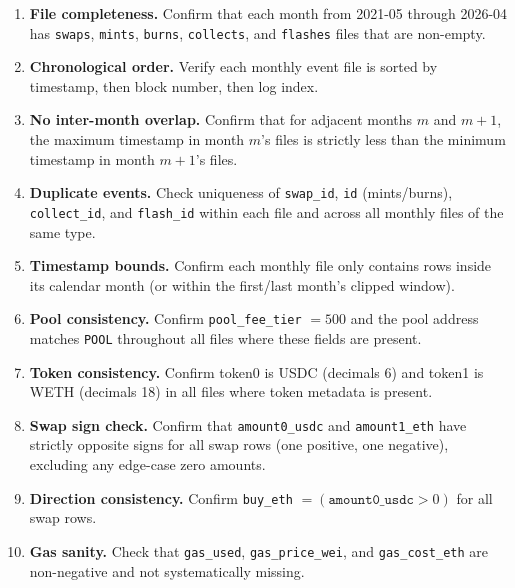 \documentclass[11pt,a4paper]{article}
\begin{document}
\begin{enumerate}
  \item \textbf{File completeness.} Confirm that each month from 2021-05
        through 2026-04 has \texttt{swaps}, \texttt{mints}, \texttt{burns},
        \texttt{collects}, and \texttt{flashes} files that are non-empty.

  \item \textbf{Chronological order.} Verify each monthly event file is
        sorted by timestamp, then block number, then log index.

  \item \textbf{No inter-month overlap.} Confirm that for adjacent months
        $m$ and $m+1$, the maximum timestamp in month $m$'s files is
        strictly less than the minimum timestamp in month $m+1$'s files.

  \item \textbf{Duplicate events.} Check uniqueness of \texttt{swap\_id},
        \texttt{id} (mints/burns), \texttt{collect\_id}, and
        \texttt{flash\_id} within each file and across all monthly files
        of the same type.

  \item \textbf{Timestamp bounds.} Confirm each monthly file only contains
        rows inside its calendar month (or within the first/last month's
        clipped window).

  \item \textbf{Pool consistency.} Confirm \texttt{pool\_fee\_tier} $=
        500$ and the pool address matches \texttt{POOL} throughout all files
        where these fields are present.

  \item \textbf{Token consistency.} Confirm token0 is USDC (decimals 6)
        and token1 is WETH (decimals 18) in all files where token metadata
        is present.

  \item \textbf{Swap sign check.} Confirm that \texttt{amount0\_usdc} and
        \texttt{amount1\_eth} have strictly opposite signs for all swap rows
        (one positive, one negative), excluding any edge-case zero amounts.

  \item \textbf{Direction consistency.} Confirm \texttt{buy\_eth} $=
        (\texttt{amount0\_usdc} > 0)$ for all swap rows.

  \item \textbf{Gas sanity.} Check that \texttt{gas\_used},
        \texttt{gas\_price\_wei}, and \texttt{gas\_cost\_eth} are
        non-negative and not systematically missing.


\end{enumerate}
\end{document}
